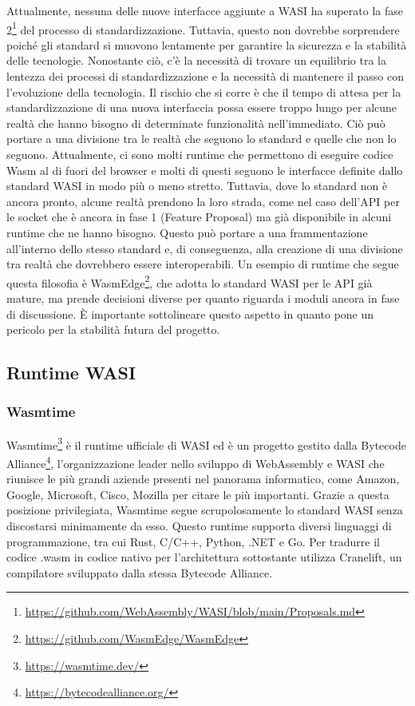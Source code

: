 Attualmente, nessuna delle nuove interfacce aggiunte a WASI ha superato la fase
2\footnote{\url{https://github.com/WebAssembly/WASI/blob/main/Proposals.md}} del processo di standardizzazione.
Tuttavia, questo non dovrebbe sorprendere poiché gli standard si muovono lentamente per garantire la sicurezza e la
stabilità delle tecnologie. Nonostante ciò, c'è la necessità di trovare un equilibrio tra la lentezza dei processi di
standardizzazione e la necessità di mantenere il passo con l'evoluzione della tecnologia. Il rischio che si corre è che
il tempo di attesa per la standardizzazione di una nuova interfaccia possa essere troppo lungo per alcune realtà che
hanno bisogno di determinate funzionalità nell'immediato. Ciò può portare a una divisione tra le realtà che seguono lo
standard e quelle che non lo seguono. Attualmente, ci sono molti runtime che permettono di eseguire codice Wasm al di
fuori del browser e molti di questi seguono le interfacce definite dallo standard WASI in modo più o meno stretto.
Tuttavia, dove lo standard non è ancora pronto, alcune realtà prendono la loro strada, come nel caso dell'API per le
socket che è ancora in fase 1 (Feature Proposal) ma già disponibile in alcuni runtime che ne hanno bisogno. Questo può
portare a una frammentazione all'interno dello stesso standard e, di conseguenza, alla creazione di una divisione tra
realtà che dovrebbero essere interoperabili. Un esempio di runtime che segue questa filosofia è
WasmEdge\footnote{\url{https://github.com/WasmEdge/WasmEdge}}, che adotta lo standard WASI per le API già mature, ma
prende decisioni diverse per quanto riguarda i moduli ancora in fase di discussione. È importante sottolineare questo
aspetto in quanto pone un pericolo per la stabilità futura del progetto. \\

\subsection{Runtime WASI}

\subsubsection{Wasmtime}
Wasmtime\footnote{\url{https://wasmtime.dev/}} è il runtime ufficiale di WASI ed è un progetto gestito dalla Bytecode
Alliance\footnote{\url{https://bytecodealliance.org/}}, l'organizzazione leader nello sviluppo di WebAssembly e WASI che
riunisce le più grandi aziende presenti nel panorama informatico, come Amazon, Google, Microsoft, Cisco, Mozilla per
citare le più importanti. Grazie a questa posizione privilegiata, Wasmtime segue scrupolosamente lo standard WASI senza
discostarsi minimamente da esso. Questo runtime supporta diversi linguaggi di programmazione, tra cui Rust, C/C++,
Python, .NET e Go. Per tradurre il codice .wasm in codice nativo per l'architettura sottostante utilizza Cranelift, un
compilatore sviluppato dalla stessa Bytecode Alliance.

